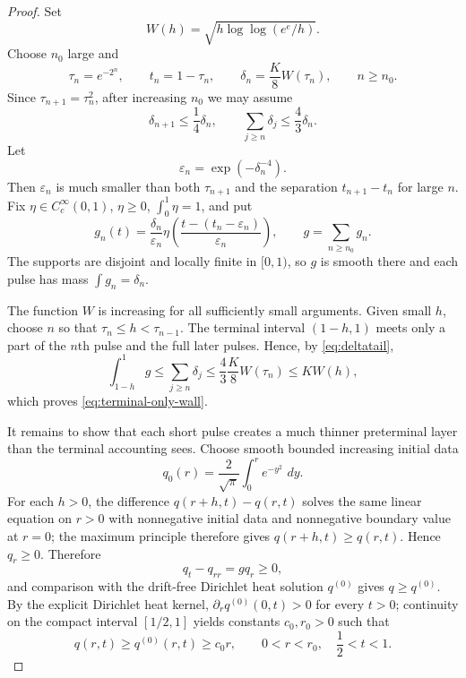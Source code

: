 \documentclass[11pt]{article}
\numberwithin{equation}{section}
\theoremstyle{definition}
\newcommand{\dd}{\,d}
\begin{document}
\begin{proof}
Set
\[
 W(h)=\sqrt{h\log\log(e^e/h)}.
\]
Choose $n_0$ large and
\[
 \tau_n=e^{-2^n},\qquad t_n=1-\tau_n,\qquad
 \delta_n=\frac K8 W(\tau_n),\qquad n\ge n_0.
\]
Since $\tau_{n+1}=\tau_n^2$, after increasing $n_0$ we may assume
\begin{equation}\label{eq:deltatail}
 \delta_{n+1}\le\frac14\delta_n,
 \qquad
 \sum_{j\ge n}\delta_j\le\frac43\delta_n.
\end{equation}
Let
\[
 \varepsilon_n=\exp(-\delta_n^{-4}).
\]
Then $\varepsilon_n$ is much smaller than both $\tau_{n+1}$ and the separation $t_{n+1}-t_n$ for large $n$.  Fix $\eta\in C_c^\infty(0,1)$, $\eta\ge0$, $\int_0^1\eta=1$, and put
\[
 g_n(t)=\frac{\delta_n}{\varepsilon_n}
 \eta\!\left(\frac{t-(t_n-\varepsilon_n)}{\varepsilon_n}\right),
 \qquad
 g=\sum_{n\ge n_0}g_n.
\]
The supports are disjoint and locally finite in $[0,1)$, so $g$ is smooth there and each pulse has mass $\int g_n=\delta_n$.

The function $W$ is increasing for all sufficiently small arguments.  Given small $h$, choose $n$ so that $\tau_n\le h<\tau_{n-1}$.  The terminal interval $(1-h,1)$ meets only a part of the $n$th pulse and the full later pulses.  Hence, by \eqref{eq:deltatail},
\[
 \int_{1-h}^1g
 \le\sum_{j\ge n}\delta_j
 \le\frac43\frac K8W(\tau_n)
 \le K W(h),
\]
which proves \eqref{eq:terminal-only-wall}.

It remains to show that each short pulse creates a much thinner preterminal layer than the terminal accounting sees.  Choose smooth bounded increasing initial data
\[
 q_0(r)=\frac{2}{\sqrt\pi}\int_0^r e^{-y^2}\,\dd y.
\]
For each $h>0$, the difference $q(r+h,t)-q(r,t)$ solves the same linear equation on $r>0$ with nonnegative initial data and nonnegative boundary value at $r=0$; the maximum principle therefore gives $q(r+h,t)\ge q(r,t)$.  Hence $q_r\ge0$.  Therefore
\[
 q_t-q_{rr}=gq_r\ge0,
\]
and comparison with the drift-free Dirichlet heat solution $q^{(0)}$ gives $q\ge q^{(0)}$.  By the explicit Dirichlet heat kernel, $\partial_rq^{(0)}(0,t)>0$ for every $t>0$; continuity on the compact interval $[1/2,1]$ yields constants $c_0,r_0>0$ such that
\begin{equation}\label{eq:baseline-linear}
 q(r,t)\ge q^{(0)}(r,t)\ge c_0r,
 \qquad 0<r<r_0,\quad \frac12<t<1.
\end{equation}


\end{proof}
\end{document}
